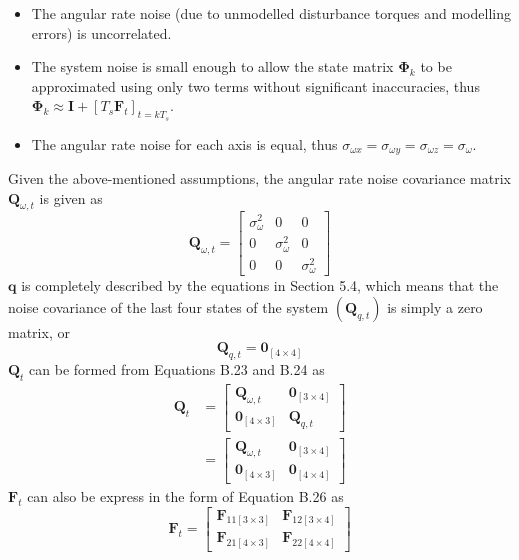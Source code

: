 \begin{itemize}
	\item The angular rate noise (due to unmodelled disturbance torques and modelling errors) is uncorrelated.
	
	\item The system noise is small enough to allow the state matrix $\boldsymbol{\Phi}_{k}$ to be approximated using only two terms without significant inaccuracies, thus $\mathbf{\Phi}_{k} \approx \mathbf{I}+\left[T_{s} \mathbf{F}_{t}\right]_{t=k T_{s}}$.
	
	\item The angular rate noise for each axis is equal, thus $\sigma_{\omega x}=\sigma_{\omega y}=\sigma_{\omega z}=\sigma_{\omega}$.
	
\end{itemize}
Given the above-mentioned assumptions, the angular rate noise covariance matrix $\mathbf{Q}_{\omega, t}$ is given as
$$
\mathbf{Q}_{\omega, t}=\left[\begin{array}{ccc}
\sigma_{\omega}^{2} & 0 & 0 \\
0 & \sigma_{\omega}^{2} & 0 \\
0 & 0 & \sigma_{\omega}^{2}
\end{array}\right]
$$
$\mathbf{q}$ is completely described by the equations in Section 5.4, which means that the noise covariance of the last four states of the system $\left(\mathbf{Q}_{q, t}\right)$ is simply a zero matrix, or
$$
\mathbf{Q}_{q, t}=\mathbf{0}_{[4 \times 4]}
$$
$\mathbf{Q}_{t}$ can be formed from Equations B.23 and B.24 as
$$
\begin{aligned}
\mathbf{Q}_{t} &=\left[\begin{array}{ll}
\mathbf{Q}_{\omega, t} & \mathbf{0}_{[3 \times 4]} \\
\mathbf{0}_{[4 \times 3]} & \mathbf{Q}_{q, t}
\end{array}\right] \\
&=\left[\begin{array}{ll}
\mathbf{Q}_{\omega, t} & \mathbf{0}_{[3 \times 4]} \\
\mathbf{0}_{[4 \times 3]} & \mathbf{0}_{[4 \times 4]}
\end{array}\right]
\end{aligned}
$$
$\mathbf{F}_{t}$ can also be express in the form of Equation B.26 as
$$
\mathbf{F}_{t}=\left[\begin{array}{ll}
\mathbf{F}_{11[3 \times 3]} & \mathbf{F}_{12[3 \times 4]} \\
\mathbf{F}_{21[4 \times 3]} & \mathbf{F}_{22[4 \times 4]}
\end{array}\right]
$$
